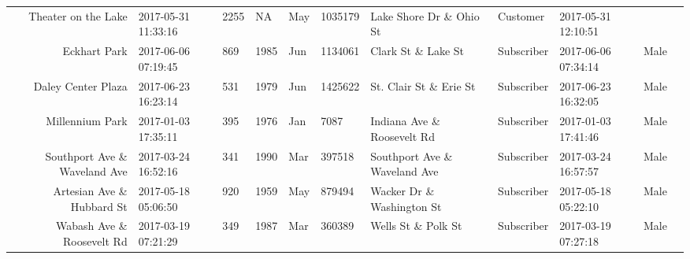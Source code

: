 \documentclass[11pt]{article}
\begin{document}
\begin{tabular}{r|llllllllll}
	 Theater on the Lake                 & 2017-05-31 11:33:16                 & 2255                                &   NA                                & May                                 & 1035179                             & Lake Shore Dr \& Ohio St           & Customer                            & 2017-05-31 12:10:51                 &                                    \\
	 Eckhart Park                        & 2017-06-06 07:19:45                 &  869                                & 1985                                & Jun                                 & 1134061                             & Clark St \& Lake St                & Subscriber                          & 2017-06-06 07:34:14                 & Male                               \\
	 Daley Center Plaza                  & 2017-06-23 16:23:14                 &  531                                & 1979                                & Jun                                 & 1425622                             & St. Clair St \& Erie St            & Subscriber                          & 2017-06-23 16:32:05                 & Male                               \\
	 Millennium Park                     & 2017-01-03 17:35:11                 &  395                                & 1976                                & Jan                                 &    7087                             & Indiana Ave \& Roosevelt Rd        & Subscriber                          & 2017-01-03 17:41:46                 & Male                               \\
	 Southport Ave \& Waveland Ave      & 2017-03-24 16:52:16                 &  341                                & 1990                                & Mar                                 &  397518                             & Southport Ave \& Waveland Ave      & Subscriber                          & 2017-03-24 16:57:57                 & Male                               \\
	 Artesian Ave \& Hubbard St         & 2017-05-18 05:06:50                 &  920                                & 1959                                & May                                 &  879494                             & Wacker Dr \& Washington St         & Subscriber                          & 2017-05-18 05:22:10                 & Male                               \\
	 Wabash Ave \& Roosevelt Rd         & 2017-03-19 07:21:29                 &  349                                & 1987                                & Mar                                 &  360389                             & Wells St \& Polk St                & Subscriber                          & 2017-03-19 07:27:18                 & Male                               \\

\end{tabular}
\end{document}
